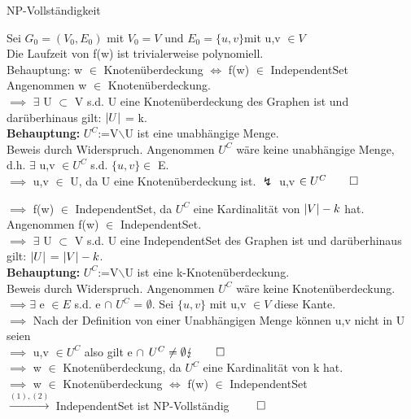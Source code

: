 \documentclass[answers]{submit}
\begin{document}
\begin{exercise}[6]{NP-Vollständigkeit}
{    Sei $G_0 = (V_0,E_0)$ mit $V_0 = V $ und $E_0 = \{ u,v\} $mit u,v $\in V$ \\

    Die Laufzeit von f(w) ist trivialerweise polynomiell. \\

    Behauptung: w $\in$ Knotenüberdeckung $\iff$ f(w) $\in$ IndependentSet \\

    Angenommen w $\in$ Knotenüberdeckung. \\

    $\implies$ $\exists$ U $\subset$ V s.d. U eine Knotenüberdeckung des Graphen ist und darüberhinaus gilt: $\left\vert U \right\vert$ = k. \\

    \textbf{Behauptung:} $U^C$:=V$\backslash$U ist eine unabhängige Menge. \\

    Beweis durch Widerspruch. Angenommen $U^C$ wäre keine unabhängige Menge, d.h. $\exists$ u,v $\in U^C$ s.d. $\{u,v\} \in$ E. \\

    $\implies$ u,v $\in$ U, da U eine Knotenüberdeckung ist. $\lightning$ u,v $\in U^C \qed$

    $\implies$ f(w) $\in$ IndependentSet, da $U^C$ eine Kardinalität von $\left\vert V \right\vert-k$ hat. \\

    Angenommen f(w) $\in$ IndependentSet. \\

    $\implies$ $\exists$ U $\subset$ V s.d. U eine IndependentSet des Graphen ist und darüberhinaus gilt: $\left\vert U \right\vert$ = $\left\vert V \right\vert-k$. \\

    \textbf{Behauptung:} $U^C$:=V$\backslash$U ist eine k-Knotenüberdeckung. \\

    Beweis durch Widerspruch. Angenommen $U^C$ wäre keine Knotenüberdeckung. \\

    $\implies \exists$ e $\in E$ s.d. e $\cap$  $U^C$ = $\emptyset$. Sei $\{u,v\}$ mit u,v $\in V$ diese Kante. \\

    $\implies$ Nach der Definition von einer Unabhängigen Menge können u,v nicht in U seien \\

    $\implies$ u,v $\in U^C$ also gilt  e $\cap$  $U^C \neq \emptyset \lightning \qed $ \\

    $\implies$ w $\in$ Knotenüberdeckung, da $U^C$ eine Kardinalität von k hat. \\

    $\implies$ w $\in$ Knotenüberdeckung $\iff$ f(w) $\in$ IndependentSet \\

    $\xrightarrow{(1),(2)}$ IndependentSet ist NP-Vollständig $\qed$
  }
\end{exercise}
\end{document}
